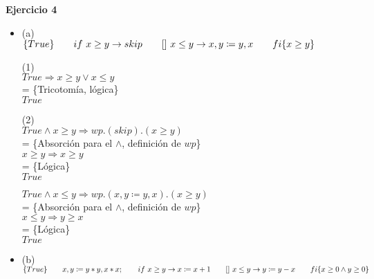 \documentclass[12pt]{article}
\begin{document}
\textbf{Ejercicio 4}

\begin{itemize}
    \item (a)\\
            $\{True\}\\
            \hspace*{20pt}if ~x \ge y \rightarrow skip\\
            \hspace*{20pt}[] ~x \le y \rightarrow x, y \coloneqq y, x\\
            \hspace*{20pt}fi\\
            \{x \ge y\}$

    \bigbreak

    (1)\\
    $True \Rightarrow x \ge y \lor x \le y$\\
    = \{Tricotomía, lógica\}\\
    $True$

    \bigbreak

    (2)\\
    $True \land x \ge y \Rightarrow wp.(skip).(x \ge y)$\\
    = \{Absorción para el $\land$, definición de $wp$\}\\
    $x \ge y \Rightarrow x \ge y$\\
    = \{Lógica\}\\
    $True$

    $True \land x \le y \Rightarrow wp.(x, y \coloneqq y, x).(x \ge y)$\\
    = \{Absorción para el $\land$, definición de $wp$\}\\
    $x \le y \Rightarrow y \ge x$\\
    = \{Lógica\}\\
    $True$

    \item (b)\\
            $\{True\}\\
            \hspace*{20pt}x, y \coloneqq y * y, x * x;\\
            \hspace*{20pt}if~ x \ge y \rightarrow x \coloneqq x + 1\\
            \hspace*{20pt}[]~ x \le y \rightarrow y \coloneqq y - x\\
            \hspace*{20pt}fi\\
            \{x \ge 0 \land y \ge 0\}$


\end{itemize}
\end{document}
